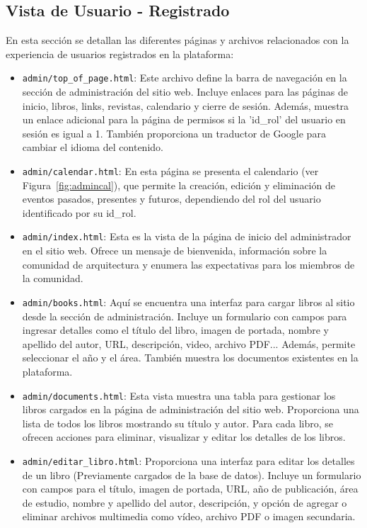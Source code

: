 \documentclass[a4paper, 12pt]{book}
\begin{document}
\subsection{Vista de Usuario - Registrado}
\label{sec:vista_usuarios_registrado}
En esta sección se detallan las diferentes páginas y archivos relacionados con la experiencia de usuarios registrados en la plataforma:

\begin{itemize}
  \item \texttt{admin/top\_of\_page.html}: Este archivo define la barra de navegación en la sección de administración del sitio web. Incluye enlaces para las páginas de inicio, libros, links, revistas, calendario y cierre de sesión. Además, muestra un enlace adicional para la página de permisos si la {'id\_rol'} del usuario en sesión es igual a 1. También proporciona un traductor de Google para cambiar el idioma del contenido.
  \item \texttt{admin/calendar.html}: En esta página se presenta el calendario (ver Figura~\ref{fig:admincal}), que permite la creación, edición y eliminación de eventos pasados, presentes y futuros, dependiendo del rol del usuario identificado por su id\_rol.
  \item \texttt{admin/index.html}: Esta es la vista de la página de inicio del administrador en el sitio web. Ofrece un mensaje de bienvenida, información sobre la comunidad de arquitectura y enumera las expectativas para los miembros de la comunidad.
  \item \texttt{admin/books.html}: Aquí se encuentra una interfaz para cargar libros al sitio desde la sección de administración. Incluye un formulario con campos para ingresar detalles como el título del libro, imagen de portada, nombre y apellido del autor, URL, descripción, video, archivo PDF... Además, permite seleccionar el año y el área. También muestra los documentos existentes en la plataforma.
  \item \texttt{admin/documents.html}: Esta vista muestra una tabla para gestionar los libros cargados en la página de administración del sitio web. Proporciona una lista de todos los libros mostrando su título y autor. Para cada libro, se ofrecen acciones para eliminar, visualizar y editar los detalles de los libros.
  \item \texttt{admin/editar\_libro.html}: Proporciona una interfaz para editar los detalles de un libro {(Previamente cargados de la base de datos)}. Incluye un formulario con campos para el título, imagen de portada, URL, año de publicación, área de estudio, nombre y apellido del autor, descripción, y opción de agregar o eliminar archivos multimedia como vídeo, archivo PDF o imagen secundaria.

\end{itemize}
\end{document}
